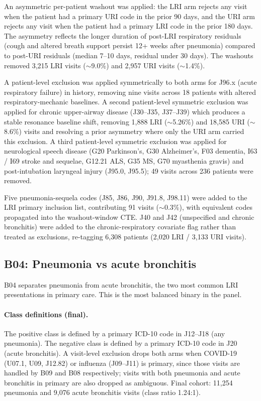 \documentclass[utf8]{frontiers_suppmat} %
\begin{document}
An asymmetric per-patient washout was applied: the LRI arm rejects
any visit when the patient had a primary URI code in the prior 90
days, and the URI arm rejects any visit when the patient had a primary
LRI code in the prior 180 days. The asymmetry reflects the longer
duration of post-LRI respiratory residuals (cough and altered breath
support persist 12+ weeks after pneumonia) compared to post-URI
residuals (median 7--10 days, residual under 30 days). The washouts
removed 3{,}215 LRI visits ($\sim$9.0\%) and 2{,}957 URI visits
($\sim$1.4\%).

A patient-level exclusion was applied symmetrically to both arms for
J96.x (acute respiratory failure) in history, removing nine visits
across 18 patients with altered respiratory-mechanic baselines. A
second patient-level symmetric exclusion was applied for chronic
upper-airway disease (J30--J35, J37--J39) which produces a stable
resonance baseline shift, removing 1{,}888 LRI ($\sim$5.26\%) and
18{,}585 URI ($\sim$8.6\%) visits and resolving a prior asymmetry
where only the URI arm carried this exclusion. A third patient-level
symmetric exclusion was applied for neurological speech disease
(G20 Parkinson's, G30 Alzheimer's, F03 dementia, I63 / I69 stroke
and sequelae, G12.21 ALS, G35 MS, G70 myasthenia gravis) and
post-intubation laryngeal injury (J95.0, J95.5); 49 visits across
236 patients were removed.

Five pneumonia-sequela codes (J85, J86, J90, J91.8, J98.11) were
added to the LRI primary inclusion list, contributing 91 visits
($\sim$0.3\%), with equivalent codes propagated into the washout-window
CTE. J40 and J42 (unspecified and chronic bronchitis) were added to
the chronic-respiratory covariate flag rather than treated as
exclusions, re-tagging 6{,}308 patients (2{,}020 LRI / 3{,}133 URI
visits).

\subsection{B04: Pneumonia vs acute bronchitis}
\label{sec:supp-b04}

B04 separates pneumonia from acute bronchitis, the two most common
LRI presentations in primary care. This is the most balanced binary
in the panel.

\paragraph{Class definitions (final).} The positive class is defined
by a primary ICD-10 code in J12--J18 (any pneumonia). The negative
class is defined by a primary ICD-10 code in J20 (acute bronchitis).
A visit-level exclusion drops both arms when COVID-19 (U07.1, U09,
J12.82) or influenza (J09--J11) is primary, since those
visits are handled by B09 and B08 respectively; visits with both
pneumonia and acute bronchitis in primary are also dropped as
ambiguous. Final cohort: 11{,}254 pneumonia and 9{,}076 acute
bronchitis visits (class ratio 1.24:1).
\end{document}
